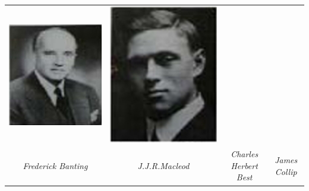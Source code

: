 \begin{tabular}{@{}cccc@{}}
\includegraphics[scale=.7]{images/013.jpg} &
\includegraphics[scale=.6]{images/014.jpg}\\
{\small\textit{Frederick Banting}} &
{\small\textit{J.J.R.Macleod}} &
{\small\textit{Charles Herbert Best}} &
{\small\textit{James Collip}}
\end{tabular}

